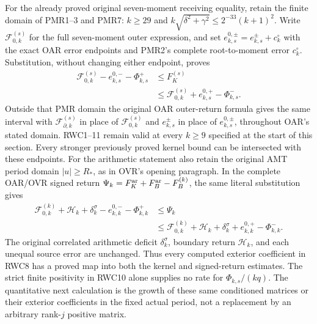 \documentclass[11pt,a4paper]{article}
\begin{document}
For the already proved original seven-moment receiving equality,
retain the finite domain of PMR1--3 and PMR7:
$k\ge29$ and $k\sqrt{\delta^2+\gamma^2}\le2^{-33}(k+1)^2$.
Write $\mathcal F_{0,k}^{(s)}$ for the full seven-moment outer
expression, and set $e_{k,s}^{0,\pm}=e_{k,s}^{\pm}+c_k^\circ$
with the exact OAR error endpoints and PMR2's complete root-to-moment
error $c_k^\circ$. Substitution, without changing either endpoint, proves
\begin{equation}\tag{RWC12}
\begin{split}
\mathcal F_{0,k}^{(s)}-e_{k,s}^{0,-}-\Phi^+_{k,s}
&\le F_K^{(s)}\\
&\le\mathcal F_{0,k}^{(s)}+e_{k,s}^{0,+}-\Phi^-_{k,s}.
\end{split}
\end{equation}
Outside that PMR domain the original OAR outer-return formula gives
the same interval with $\mathcal F_{\partial,k}^{(s)}$ in place
of $\mathcal F_{0,k}^{(s)}$ and $e_{k,s}^{\pm}$ in place of
$e_{k,s}^{0,\pm}$, throughout OAR's stated domain. RWC1--11
remain valid at every $k\ge9$ specified at the start of this section.
Every stronger previously proved kernel bound can be intersected
with these endpoints. For the arithmetic statement also retain
the original AMT period domain $|u|\ge R_*$, as in OVR's opening
paragraph. In the complete OAR/OVR signed return
$\Psi_k=F_K^{\rm ar}+F_B^{\rm ar}-F_B^{(k)}$, the same literal
substitution gives
\begin{equation}\tag{RWC13}
\begin{split}
\mathcal F_{0,k}^{(k)}+\mathcal H_k+\delta_k^\sigma
 -e_{k,k}^{0,-}-\Phi^+_{k,k}
&\le\Psi_k\\
&\le\mathcal F_{0,k}^{(k)}+\mathcal H_k+\delta_k^\sigma
 +e_{k,k}^{0,+}-\Phi^-_{k,k}.
\end{split}
\end{equation}
The original correlated arithmetic deficit $\delta_k^\sigma$,
boundary return $\mathcal H_k$, and each unequal source error
are unchanged. Thus every computed exterior coefficient in RWC8
has a proved map into both the kernel and signed-return estimates.
The strict finite positivity in RWC10 alone supplies no rate for
$\Phi_{k,s}/(kq)$. The quantitative next calculation is the growth
of these same conditioned matrices or their exterior coefficients
in the fixed actual period, not a replacement by an arbitrary
rank-$j$ positive matrix.
\end{document}
